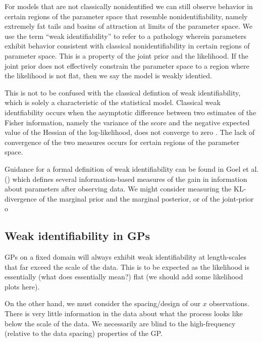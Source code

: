\documentclass{article}
\begin{document}
For models that are not classically nonidentified we can still observe behavior
in certain regions of the parameter space that resemble nonidentifiability,
namely extremely fat tails and basins of attraction at limits of the parameter
space.  We use the term ``weak identifiability'' to refer to a pathology
wherein parameters exhibit behavior consistent with classical
nonidentifiability in certain regions of parameter space. This is a property of
the joint prior and the likelihood. If the joint prior does not effectively
constrain the parameter space to a region where the likelihood is not flat,
then we say the model is weakly identied. 

This is not to be confused with the classical defintion of weak
identifiability, which is solely a characteristic of the statistical model.
Classical weak identfiability occurs when the asymptotic difference between two
estimates of the Fisher information, namely the variance of the score and the
negative expected value of the Hessian of the log-likelihood, does not converge
to zero \cite{andrews2015maximum}. The lack of convergence of the two measures
occurs for certain regions of the parameter space.

Guidance for a formal definition of weak identifiability can be found in Goel
et al.  (\cite{goel1981information}) which defines several information-based
measures of the gain in information about parameters after observing data. We
might consider measuring the KL-divergence of the marginal prior and the
marginal posterior, or of the joint-prior o 


\subsection{Weak identifiability in GPs}




GPs on a fixed domain will always exhibit weak identifiability 
at length-scales that far exceed the scale of the data. This is
to be expected as the likelihood is essentially (what does essentially
mean?) flat (we should add some likelihood plots here). 

On the other hand, we must consider the spacing/design of our $x$ observations.
There is very little information in the data about what the process looks like
below the scale of the data. We necessarily are blind to the high-frequency 
(relative to the data spacing) properties of the GP.
\end{document}
